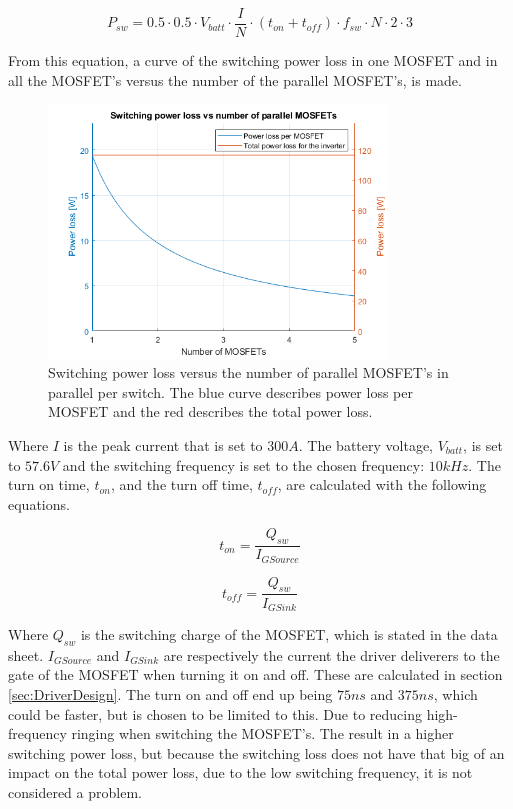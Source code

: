     \begin{equation}
        P_{sw} = 0.5 \cdot 0.5 \cdot V_{batt} \cdot \frac{I}{N} \cdot (t_{on}+t_{off}) \cdot f_{sw} \cdot N \cdot 2 \cdot 3
        \label{eq:sw_loss}
    \end{equation}
    
From this equation, a curve of the switching power loss in one MOSFET and in all the MOSFET's versus the number of the parallel MOSFET's, is made.

    \begin{figure}[H]
		\centering
		\includegraphics[width=0.8\textwidth]{pictures/hardware/Power_Board/Switch_loss.png}
		\caption{Switching power loss versus the number of parallel MOSFET's in parallel per switch. The blue curve describes power loss per MOSFET and the red describes the total power loss.}
		\label{fig:sw_loss}
	\end{figure}
	
Where $I$ is the peak current that is set to $300 A$. The battery voltage, $V_{batt}$, is set to $57.6 V$ and the switching frequency is set to the chosen frequency: $10 kHz$. The turn on time, $t_{on}$, and the turn off time, $t_{off}$, are calculated with the following equations.

    \begin{equation}
        t_{on} = \frac{Q_{sw}}{I_{GSource}}
    \end{equation}
    
    \begin{equation}
        t_{off} = \frac{Q_{sw}}{I_{GSink}}
    \end{equation}
    
Where $Q_{sw}$ is the switching charge of the MOSFET, which is stated in the data sheet.\cite{mosfet}
$I_{GSource}$ and $I_{GSink}$ are respectively the current the driver deliverers to the gate of the MOSFET when turning it on and off. These are calculated in section \ref{sec:DriverDesign}. The turn on and off end up being $75 ns$ and $375 ns$, which could be faster, but is chosen to be limited to this. Due to reducing high-frequency ringing when switching the MOSFET's. The result in a higher switching power loss, but because the switching loss does not have that big of an impact on the total power loss, due to the low switching frequency, it is not considered a problem.


